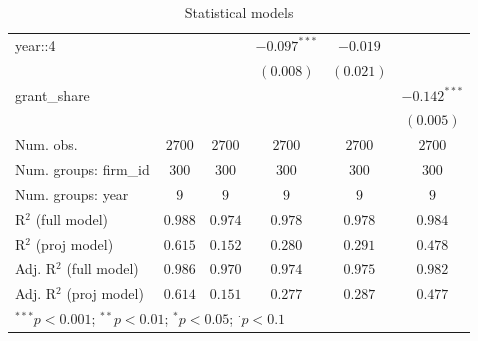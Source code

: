\begin{table}
\begin{center}
\begin{tabular}{l c c c c c}
year::4                      &                &                & $-0.097^{***}$ & $-0.019$         &                  \\
                             &                &                & $(0.008)$      & $(0.021)$        &                  \\
grant\_share                 &                &                &                &                  & $-0.142^{***}$   \\
                             &                &                &                &                  & $(0.005)$        \\
\hline
Num. obs.                    & $2700$         & $2700$         & $2700$         & $2700$           & $2700$           \\
Num. groups: firm\_id        & $300$          & $300$          & $300$          & $300$            & $300$            \\
Num. groups: year            & $9$            & $9$            & $9$            & $9$              & $9$              \\
R$^2$ (full model)           & $0.988$        & $0.974$        & $0.978$        & $0.978$          & $0.984$          \\
R$^2$ (proj model)           & $0.615$        & $0.152$        & $0.280$        & $0.291$          & $0.478$          \\
Adj. R$^2$ (full model)      & $0.986$        & $0.970$        & $0.974$        & $0.975$          & $0.982$          \\
Adj. R$^2$ (proj model)      & $0.614$        & $0.151$        & $0.277$        & $0.287$          & $0.477$          \\
\hline
\multicolumn{6}{l}{\scriptsize{$^{***}p<0.001$; $^{**}p<0.01$; $^{*}p<0.05$; $^{\cdot}p<0.1$}}
\end{tabular}
\caption{Statistical models}
\label{table:coefficients}
\end{center}
\end{table}

